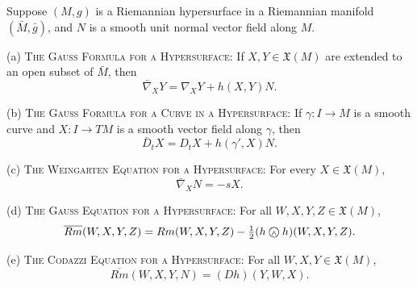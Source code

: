 \begin{theorem}
\label{thm:fundamental-equations-hypersurface}

Suppose $(M, g)$ is a Riemannian hypersurface in a Riemannian manifold $(\bar{M}, \bar{g})$, and $N$ is a smooth unit normal vector field along $M$.

(a) \textsc{The Gauss Formula for a Hypersurface}: If $X, Y \in \mathfrak{X}(M)$ are extended to an open subset of $\bar{M}$, then
\[
\bar{\nabla}_X Y = \nabla_X Y + h(X, Y)N.
\]

(b) \textsc{The Gauss Formula for a Curve in a Hypersurface}: If $\gamma: I \to M$ is a smooth curve and $X: I \to TM$ is a smooth vector field along $\gamma$, then
\[
\bar{D}_t X = D_t X + h(\gamma', X)N.
\]

(c) \textsc{The Weingarten Equation for a Hypersurface}: For every $X \in \mathfrak{X}(M)$,
\begin{equation}
\bar{\nabla}_X N = -sX.
\tag{8.11}
\end{equation}

(d) \textsc{The Gauss Equation for a Hypersurface}: For all $W, X, Y, Z \in \mathfrak{X}(M)$,
\[
\overline{Rm}(W, X, Y, Z) = Rm(W, X, Y, Z) - \tfrac{1}{2}(h \owedge h)(W, X, Y, Z).
\]

(e) \textsc{The Codazzi Equation for a Hypersurface}: For all $W, X, Y \in \mathfrak{X}(M)$,
\begin{equation}
\overline{Rm}(W, X, Y, N) = (Dh)(Y, W, X).
\tag{8.12}
\end{equation}
\end{theorem}

